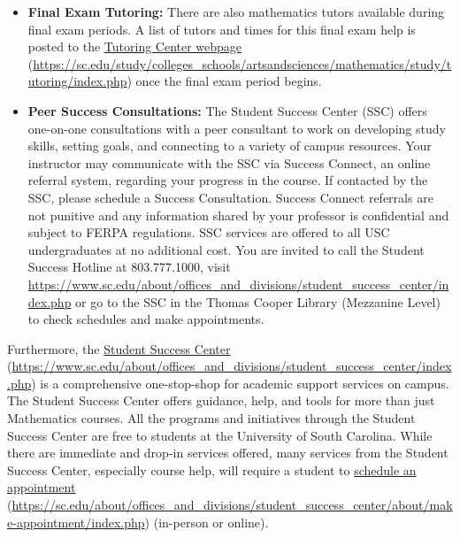 \documentclass[11pt,letterpaper]{article}
\begin{document}
\begin{itemize}
	\item {\bfseries Final Exam Tutoring:} There are also mathematics tutors available during final exam periods. A list of tutors and times for this final exam help is posted to the \href{https://sc.edu/study/colleges\_schools/artsandsciences/mathematics/study/tutoring/index.php}{Tutoring Center webpage} (\url{https://sc.edu/study/colleges\_schools/artsandsciences/mathematics/study/tutoring/index.php}) once the final exam period begins. 
	
	\item {\bfseries Peer Success Consultations:} The Student Success Center (SSC) offers one-on-one consultations with a peer consultant to work on developing study skills, setting goals, and connecting to a variety of campus resources. Your instructor may communicate with the SSC via Success Connect, an online referral system, regarding your progress in the course. If contacted by the SSC, please schedule a Success Consultation. Success Connect referrals are not punitive and any information shared by your professor is confidential and subject to FERPA regulations. SSC services are offered to all USC undergraduates at no additional cost. You are invited to call the Student Success Hotline at 803.777.1000, visit \url{https://www.sc.edu/about/offices\_and\_divisions/student\_success\_center/index.php} or go to the SSC in the Thomas Cooper Library (Mezzanine Level) to check schedules and make appointments.
	\end{itemize} \pspace

Furthermore, the \href{https://www.sc.edu/about/offices\_and\_divisions/student\_success\_center/index.php}{Student Success Center} (\url{https://www.sc.edu/about/offices\_and\_divisions/student\_success\_center/index.php}) is a comprehensive one-stop-shop for academic support services on campus. The Student Success Center offers guidance, help, and tools for more than just Mathematics courses. All the programs and initiatives through the Student Success Center are free to students at the University of South Carolina. While there are immediate and drop-in services offered, many services from the Student Success Center, especially course help, will require a student to \href{https://sc.edu/about/offices\_and\_divisions/student\_success\_center/about/make-appointment/index.php}{schedule an appointment} (\url{https://sc.edu/about/offices\_and\_divisions/student\_success\_center/about/make-appointment/index.php}) (in-person or online). 
\sectionbreak
\end{document}
